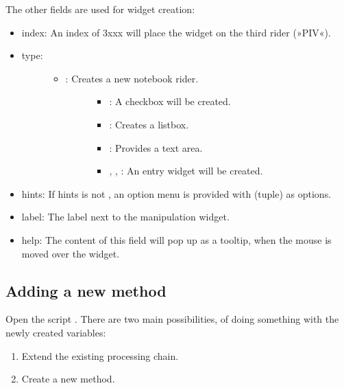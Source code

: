 \documentclass[letterpaper,10pt,english]{sphinxmanual}
\begin{document}
The other fields are used for widget creation:
\begin{itemize}
\item {} 
index: An index of 3xxx will place the widget on the third rider (»PIV«).

\item {} \begin{description}
\item[{type:}] \leavevmode\begin{itemize}
\item {} \begin{description}
\item[{: Creates a new notebook rider.}] \leavevmode\begin{itemize}
\item {} 
: A checkbox will be created.

\item {} 
: Creates a listbox.

\item {} 
: Provides a text area.

\item {} 
, , : An entry widget will be created.

\end{itemize}

\end{description}

\end{itemize}

\end{description}

\item {} 
hints: If hints is not , an option menu is provided with  (tuple) as options.

\item {} 
label: The label next to the manipulation widget.

\item {} 
help: The content of this field will pop up as a tooltip, when the mouse is moved over the widget.

\end{itemize}


\subsection{Adding a new method}
\label{\detokenize{usage:adding-a-new-method}}
Open the script . There are two main possibilities, of doing something with the newly created variables:
\begin{enumerate}
%
\item {} 
Extend the existing processing chain.

\item {} 
Create a new method.

\end{enumerate}
\end{document}

